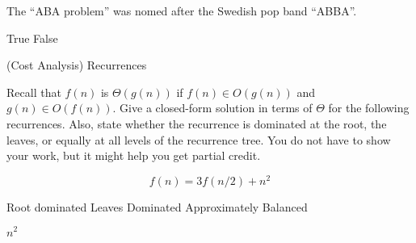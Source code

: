 \begin{cluster}
\begin{parts}
\begin{problem}[2]

The ``ABA problem'' was nomed after the Swedish pop band ``ABBA''.

\begin{pickone}
\choice True
\correctchoice False
\end{pickone}

\end{problem}

\end{parts}
\end{cluster}

\begin{cluster}{(Cost Analysis) Recurrences}

\begin{gram}
Recall that $f(n)$ is $\Theta(g(n))$
if $f(n) \in O(g(n))$ and $g(n) \in O(f(n))$.
Give a closed-form
solution in terms of $\Theta$ for the following recurrences.
Also, state whether the recurrence is dominated at the root, the
leaves, or equally at all levels of the recurrence tree.
You do not have to show your work, but it might help you get partial
credit.
\end{gram}

\begin{parts}

\begin{problem}[2]
\[
f(n) = 3 f(n/2) + n^2
\]

\begin{pickone}
\correctchoice Root dominated
\choice Leaves Dominated
\choice Approximately Balanced
\end{pickone}
\end{problem}
\begin{solution}
$n^2$
\end{solution}

\end{parts}
\end{cluster}
